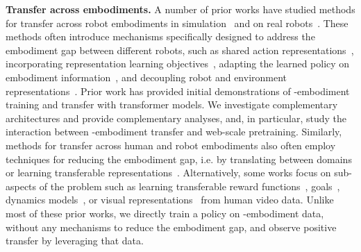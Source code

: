 \noindent \textbf{Transfer across embodiments.} A number of prior works have studied methods for transfer across robot embodiments in simulation~\cite{devin2017learning,chen2018hardware,sanchez2018graph,pathak2019learning,martin2019iros,huang2020smp,kurin2020my,zakka2021xirl,ghadirzadeh2021bayesian,gupta2021metamorph,schubert2023generalist, shah2023gnm, Zhou2023Modularity} and on real robots~\cite{dasari2019robonet, hu2022know,bousmalis2023robocat,yang2023polybot,reed2022a,salhotra2023bridging,radosavovic2023robot}. These methods often introduce mechanisms specifically designed to address the embodiment gap between different robots, such as shared action representations~\cite{martin2019iros,shao2020unigrasp}, incorporating representation learning objectives~\cite{zakka2021xirl,yang2023polybot}, adapting the learned policy on embodiment information~\cite{shao2020unigrasp,xu2021adagrasp,chen2018hardware,ghadirzadeh2021bayesian,huang2020smp}, and decoupling robot and environment representations~\cite{hu2022know}. 
Prior work has provided initial demonstrations of \cro-embodiment training \cite{reed2022a} and transfer \cite{bousmalis2023robocat, shah2023vint, radosavovic2023robot} with transformer models. %
We investigate complementary architectures and provide complementary analyses, and, in particular, study the interaction between \cro-embodiment transfer and web-scale pretraining.
Similarly, methods for transfer across human and robot embodiments also often employ techniques for reducing the embodiment gap, i.e. by translating between domains or learning transferable representations~\cite{liu2018imitation,yu2018one,sharma2019third, smith2019avid,bonardi2020learning,schmeckpeper2021reinforcement,xiong2021learning,jang2022bc,bahl2022whirl,ding2023embodied,Bahl_2023_CVPR}. Alternatively, some works focus on sub-aspects of the problem such as learning transferable reward functions~\cite{sermanet2016unsupervised,zakka2021xirl,shao2020concept,chen2021learning,kumar2023graph,alakuijala2023learning}, goals~\cite{zhou2021manipulator,wang2023mimicplay}, dynamics models~\cite{schmeckpeper2020learning}, or visual representations~\cite{nair2022r3m,xiao2022masked,radosavovic2022real,ma2022vip,majumdar2023we,karamcheti2023language,mu2023ec2,bahl2023affordances} from human video data. Unlike most of these prior works, we directly train a policy on \cro-embodiment data, without any mechanisms to reduce the embodiment gap, and observe positive transfer by leveraging that data.

